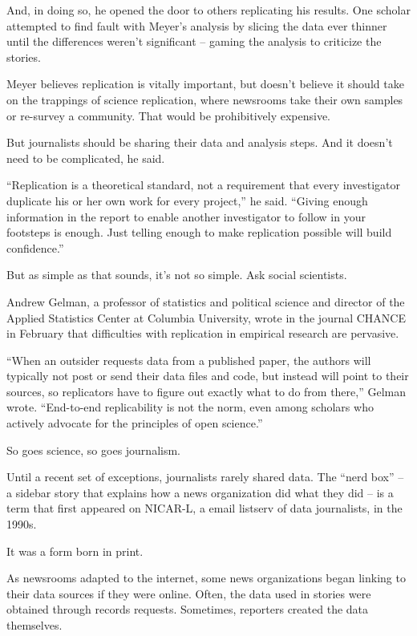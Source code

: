 \documentclass[]{book}
\begin{document}
And, in doing so, he opened the door to others replicating his results. One scholar attempted to find fault with Meyer's analysis by slicing the data ever thinner until the differences weren't significant -- gaming the analysis to criticize the stories.

Meyer believes replication is vitally important, but doesn't believe it should take on the trappings of science replication, where newsrooms take their own samples or re-survey a community. That would be prohibitively expensive.

But journalists should be sharing their data and analysis steps. And it doesn't need to be complicated, he said.

``Replication is a theoretical standard, not a requirement that every investigator duplicate his or her own work for every project,'' he said. ``Giving enough information in the report to enable another investigator to follow in your footsteps is enough. Just telling enough to make replication possible will build confidence.''

But as simple as that sounds, it's not so simple. Ask social scientists.

Andrew Gelman, a professor of statistics and political science and director of the Applied Statistics Center at Columbia University, wrote in the journal CHANCE in February that difficulties with replication in empirical research are pervasive.

``When an outsider requests data from a published paper, the authors will typically not post or send their data files and code, but instead will point to their sources, so replicators have to figure out exactly what to do from there,'' Gelman wrote. ``End-to-end replicability is not the norm, even among scholars who actively advocate for the principles of open science.''

So goes science, so goes journalism.

Until a recent set of exceptions, journalists rarely shared data. The ``nerd box'' -- a sidebar story that explains how a news organization did what they did -- is a term that first appeared on NICAR-L, a email listserv of data journalists, in the 1990s.

It was a form born in print.

As newsrooms adapted to the internet, some news organizations began linking to their data sources if they were online. Often, the data used in stories were obtained through records requests. Sometimes, reporters created the data themselves.
\end{document}
